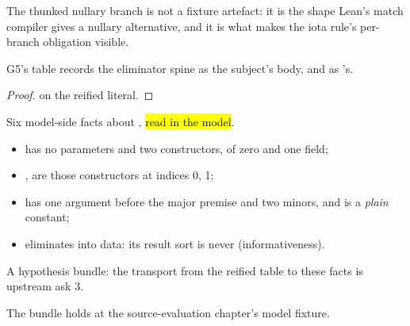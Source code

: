 \begin{remark}
 The thunked nullary branch is not a fixture artefact: it is the shape Lean's match
compiler gives a nullary alternative, and it is what makes the iota rule's per-branch
obligation visible.
\end{remark}

\begin{lemma}\label{lem:Green-g5_body_eq}
 \leanok
{}
G5's table records the eliminator spine as the subject's body, and  as
's.
\end{lemma}

\begin{proof} \leanok
{}
  on the reified literal.
\end{proof}

\begin{definition}\label{def:Green-SpikeNatFacts}
 \leanok
{}
 Six model-side facts about , \hl{read in the model}.
\begin{itemize}
\item {} has no parameters and two constructors, of zero and one field;
\item {},  are those constructors at indices 0, 1;
\item {} has one argument before the major premise and two minors, and is a
\emph{plain} constant;
\item {} eliminates into data: its result sort is never  (informativeness).
\end{itemize}
 A hypothesis bundle: the transport from the reified table to these facts is upstream
ask 3.
\end{definition}

\begin{lemma}\label{lem:Green-spikeNatFacts_natEnv}
 \leanok
{}
The  bundle holds at the source-evaluation chapter's model fixture.
\end{lemma}

